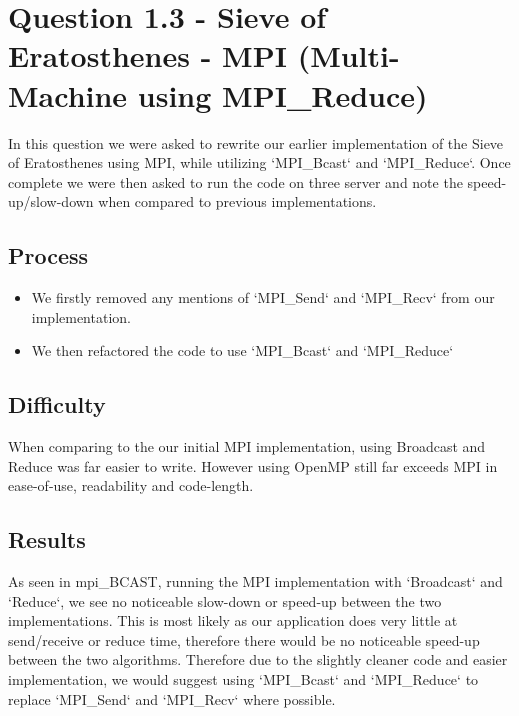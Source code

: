 \section*{Question 1.3 - Sieve of Eratosthenes - MPI (Multi-Machine using MPI\_Reduce)}

In this question we were asked to rewrite our earlier implementation of the 
Sieve of Eratosthenes using MPI, while utilizing `MPI\_Bcast` and `MPI\_Reduce`. 
Once complete we were then asked to run the code on three server and note the 
speed-up/slow-down when compared to previous implementations.

\subsection*{Process}

\begin{itemize}
    \item We firstly removed any mentions of `MPI\_Send` and `MPI\_Recv` from our 
    implementation.
    \item We then refactored the code to use `MPI\_Bcast` and `MPI\_Reduce`
\end{itemize}

\subsection*{Difficulty}

When comparing to the our initial MPI implementation, using Broadcast and Reduce 
was far easier to write. However using OpenMP still far exceeds MPI in ease-of-use, 
readability and code-length.

\subsection*{Results}

As seen in {mpi\_BCAST}, running the MPI implementation with `Broadcast` and 
`Reduce`, we see no noticeable slow-down or speed-up between the two 
implementations. This is most likely as our application does very little at 
send/receive or reduce time, therefore there would be no noticeable speed-up 
between the two algorithms. Therefore due to the slightly cleaner code and easier 
implementation, we would suggest using `MPI\_Bcast` and `MPI\_Reduce` to replace 
`MPI\_Send` and `MPI\_Recv` where possible.
